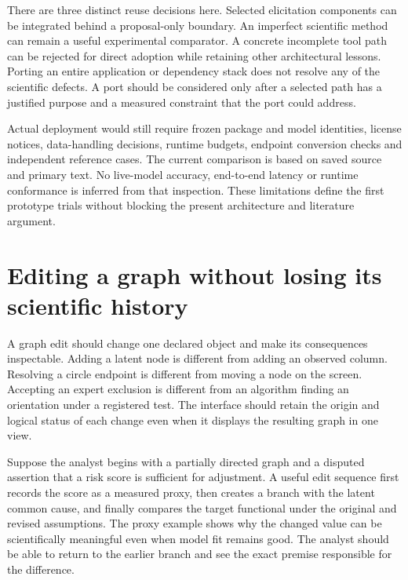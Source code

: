There are three distinct reuse decisions here. Selected elicitation
components can be integrated behind a proposal-only boundary. An
imperfect scientific method can remain a useful experimental comparator.
A concrete incomplete tool path can be rejected for direct adoption
while retaining other architectural lessons. Porting an entire
application or dependency stack does not resolve any of the scientific
defects. A port should be considered only after a selected path has a
justified purpose and a measured constraint that the port could address.

Actual deployment would still require frozen package and model
identities, license notices, data-handling decisions, runtime budgets,
endpoint conversion checks and independent reference cases. The current
comparison is based on saved source and primary text. No live-model
accuracy, end-to-end latency or runtime conformance is inferred from
that inspection. These limitations define the first prototype trials
without blocking the present architecture and literature argument.

\hypertarget{editing-a-graph-without-losing-its-scientific-history}{%
\section{Editing a graph without losing its scientific
history}\label{editing-a-graph-without-losing-its-scientific-history}}

A graph edit should change one declared object and make its consequences
inspectable. Adding a latent node is different from adding an observed
column. Resolving a circle endpoint is different from moving a node on
the screen. Accepting an expert exclusion is different from an algorithm
finding an orientation under a registered test. The interface should
retain the origin and logical status of each change even when it
displays the resulting graph in one view.

Suppose the analyst begins with a partially directed graph and a
disputed assertion that a risk score is sufficient for adjustment. A
useful edit sequence first records the score as a measured proxy, then
creates a branch with the latent common cause, and finally compares the
target functional under the original and revised assumptions. The proxy
example shows why the changed value can be scientifically meaningful
even when model fit remains good. The analyst should be able to return
to the earlier branch and see the exact premise responsible for the
difference.

